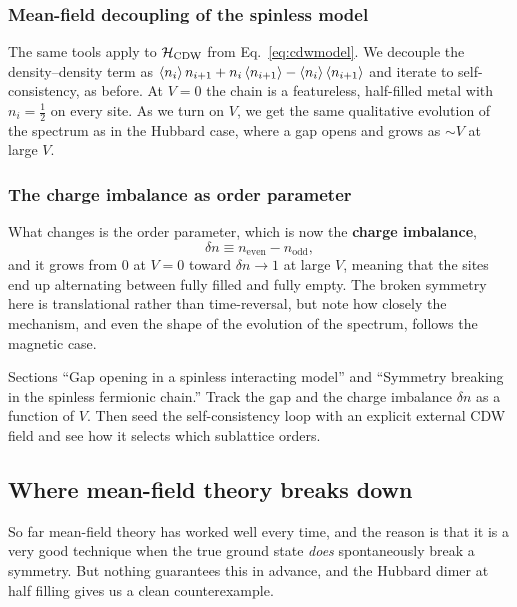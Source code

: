 \documentclass[lecture_notes.tex]{subfiles}
\begin{document}
\subsubsection{Mean-field decoupling of the spinless model}
The same tools apply to $\mathcal{H}_{\mathrm{CDW}}$ from Eq.~\eqref{eq:cdwmodel}. We decouple the
density--density term as $\expval{n_i} n_{i+1} + n_i\expval{n_{i+1}} -
\expval{n_i}\expval{n_{i+1}}$ and iterate to self-consistency, as before. At $V=0$ the
chain is a featureless, half-filled metal with $n_i = \tfrac12$ on every site. As we turn on $V$,
we get the same qualitative evolution of the spectrum as in the Hubbard case, where a gap opens
and grows as $\sim V$ at large $V$.

\subsubsection{The charge imbalance as order parameter}
What changes is the order parameter, which is now the
\textbf{charge imbalance},
\begin{equation}
  \delta n \equiv n_{\text{even}} - n_{\text{odd}},
\end{equation}
and it grows from $0$ at $V=0$ toward $\delta n \to 1$ at large $V$, meaning that the sites end
up alternating between fully filled and fully empty. The broken symmetry here is translational
rather than time-reversal, but note how closely the mechanism, and even the shape of the
evolution of the spectrum, follows the magnetic case.

\begin{notebook}
Sections ``Gap opening in a spinless interacting model'' and ``Symmetry breaking in the spinless
fermionic chain.'' Track the gap and the charge imbalance $\delta n$ as a function of $V$. Then
seed the self-consistency loop with an explicit external CDW field and see how it selects which
sublattice orders.
\end{notebook}

\subsection{Where mean-field theory breaks down}
\label{sec:breakdown}
So far mean-field theory has worked well every time, and the reason is that it is a very good
technique when the true ground state \emph{does} spontaneously break a symmetry. But nothing
guarantees this in advance, and the Hubbard dimer at half filling gives us a clean
counterexample.
\end{document}
